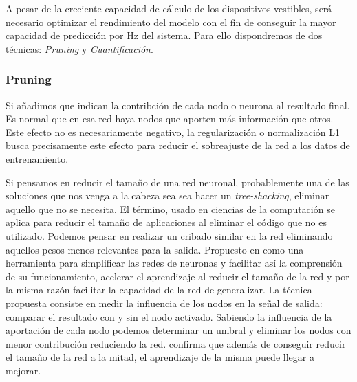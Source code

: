   A pesar de la creciente capacidad de cálculo de los dispositivos vestibles, será necesario optimizar el rendimiento del modelo con el fin de conseguir la mayor capacidad de predicción por Hz del sistema. Para ello dispondremos de dos técnicas: \textit{Pruning} y \textit{Cuantificación}.

\subsubsection{Pruning}

Si añadimos que indican la contribción de cada nodo o neurona al resultado final. Es normal que en esa red haya nodos que aporten más información que otros. Este efecto no es necesariamente negativo, la regularización o normalización L1 busca precisamente este efecto para reducir el sobreajuste de la red a los datos de entrenamiento.


Si pensamos en reducir el tamaño de una red neuronal, probablemente una de las soluciones que nos venga a la cabeza sea sea hacer un \textit{tree-shacking}, eliminar aquello que no se necesita. El término, usado en ciencias de la computación se aplica para reducir el tamaño de aplicaciones al eliminar el código que no es utilizado. Podemos pensar en realizar un cribado similar en la red eliminando aquellos pesos menos relevantes para la salida. Propuesto en  como una herramienta para simplificar las redes de neuronas y facilitar así la comprensión de su funcionamiento, acelerar el aprendizaje al reducir el tamaño de la red y por la misma razón facilitar la capacidad de la red de generalizar. La técnica propuesta consiste en medir la influencia de los nodos en la señal de salida: comparar el resultado con y sin el nodo activado. Sabiendo la influencia de la aportación de cada nodo podemos determinar un umbral y eliminar los nodos con menor contribución reduciendo la red.  confirma que además de conseguir reducir el tamaño de la red a la mitad, el aprendizaje de la misma puede llegar a mejorar.


